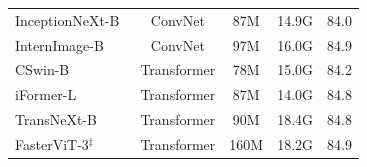 \documentclass[11pt]{article}
\begin{document}
\begin{table}[htbp]
{\begin{tabular}{l|c|c c|c}
            \midrule
            InceptionNeXt-B~
            & ConvNet       & 87M       & 14.9G     & 84.0 \\
            InternImage-B~
            & ConvNet       & 97M       & 16.0G     & 84.9 \\
            CSwin-B~
            & Transformer   & 78M       & 15.0G     & 84.2 \\
            iFormer-L~
            & Transformer   & 87M       & 14.0G     & 84.8 \\
            TransNeXt-B~
            & Transformer   & 90M       & 18.4G     & 84.8 \\
            FasterViT-3$^\ddag$~
            & Transformer   & 160M      & 18.2G     & 84.9 \\

            \bottomrule
        \end{tabular}
}
\end{table}
\end{document}
